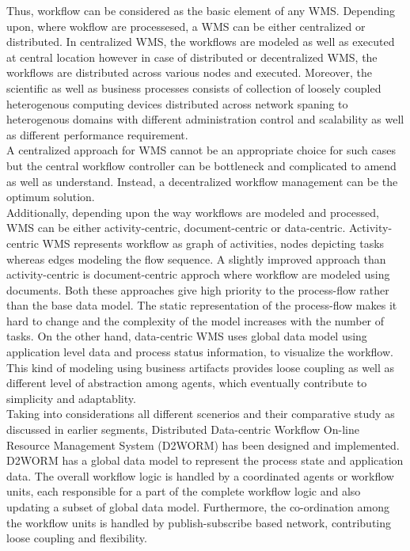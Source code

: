 Thus, workflow can be considered as the basic element of any \acrshort{WMS}. Depending upon, where wokflow are processesed, a \acrshort{WMS} can be either centralized or distributed. In centralized \acrshort{WMS}, the workflows are modeled as well as executed at central location however in case of distributed or decentralized \acrshort{WMS}, the workflows are distributed across various nodes and executed.\cite{Lee:2000aa} Moreover, the scientific as well as business processes consists of collection of loosely coupled heterogenous computing devices distributed across network spaning to heterogenous domains with different administration control and scalability as well as different performance requirement. \cite{Schneider:2015aa, Alonso:2015aa}
\\

A centralized approach for \acrshort{WMS} cannot be an appropriate choice for such cases but the central workflow controller can be bottleneck and complicated to amend as well as understand. \cite{Dogac:2015aa}Instead, a decentralized workflow management can be the optimum solution. \cite{Alonso:2015aa}
\\

Additionally, depending upon the way workflows are modeled and processed, \acrshort{WMS} can be either activity-centric, document-centric or data-centric. Activity-centric \acrshort{WMS} represents workflow as graph of activities, nodes depicting tasks whereas edges modeling the flow sequence. A slightly improved approach than activity-centric is document-centric approch where workflow are modeled using documents. Both these approaches give high priority to the process-flow rather than the base data model. The static representation of the process-flow makes it hard to change and the complexity of the model increases with the number of tasks. On the other hand, data-centric \acrshort{WMS} uses global data model using application level data and process status information, to visualize the workflow. This kind of  modeling using business artifacts provides loose coupling as well as different level of abstraction among agents, which eventually contribute to simplicity and adaptablity.\cite{Jergler:2015aa, Cohn:2015aa}
\\

Taking into considerations all different scenerios and their comparative study as discussed in earlier segments, Distributed Data-centric Workflow On-line Resource Management System (\acrshort{D2WORM}) has been designed and implemented. \acrshort{D2WORM} has a global data model to represent the process state and application data. The overall workflow logic is handled by a coordinated agents or workflow units, each responsible for a part of the complete workflow logic and also updating a subset of global data model. Furthermore, the co-ordination among the workflow units is handled by publish-subscribe based network, contributing loose coupling and flexibility.\cite{Jergler:2015aa}
\\

